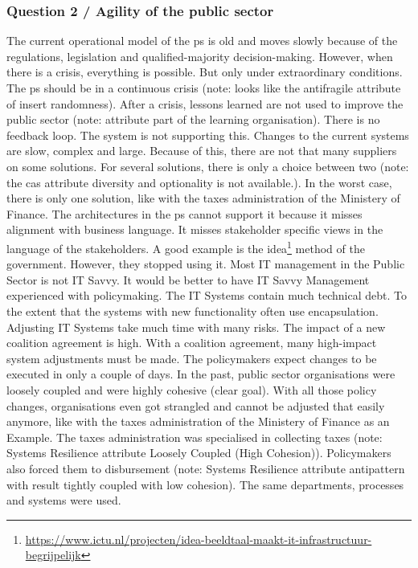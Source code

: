 \subsubsection{Question 2 / Agility of the public sector}
The current operational model of the \gls{ps} is old and moves slowly because of the regulations, legislation and qualified-majority decision-making. However, when there is a crisis, everything is possible. But only under extraordinary conditions. The \acrshort{ps} should be in a continuous crisis (note: looks like the \gls{antifragile} attribute of insert randomness). After a crisis, lessons learned are not used to improve the public sector (note: attribute part of the learning organisation). There is no feedback loop. The system is not supporting this. Changes to the current systems are slow, complex and large. Because of this, there are not that many suppliers on some solutions. For several solutions, there is only a choice between two (note: the \acrshort{cas} attribute diversity and optionality is not available.). In the worst case, there is only one solution, like with the taxes administration of the Ministery of Finance. The architectures in the \acrshort{ps} cannot support it because it misses alignment with business language. It misses stakeholder specific views in the language of the stakeholders. A good example is the \acrfull{idea}\footnote{\url{https://www.ictu.nl/projecten/idea-beeldtaal-maakt-it-infrastructuur-begrijpelijk}} method of the government. However, they stopped using it. 
Most IT management in the Public Sector is not IT Savvy. It would be better to have IT Savvy Management experienced with policymaking. The IT Systems contain much technical debt. To the extent that the systems with new functionality often use encapsulation. Adjusting IT Systems take much time with many risks. The impact of a new coalition agreement is high. With a coalition agreement, many high-impact system adjustments must be made. The policymakers expect changes to be executed in only a couple of days. In the past, public sector organisations were loosely coupled and were highly cohesive (clear goal). With all those policy changes, organisations even got strangled and cannot be adjusted that easily anymore, like with the taxes administration of the Ministery of Finance as an Example. The taxes administration was specialised in collecting taxes (note: Systems Resilience attribute Loosely Coupled (High Cohesion)). Policymakers also forced them to disbursement (note: Systems Resilience attribute antipattern with result tightly coupled with low cohesion). The same departments, processes and systems were used.
